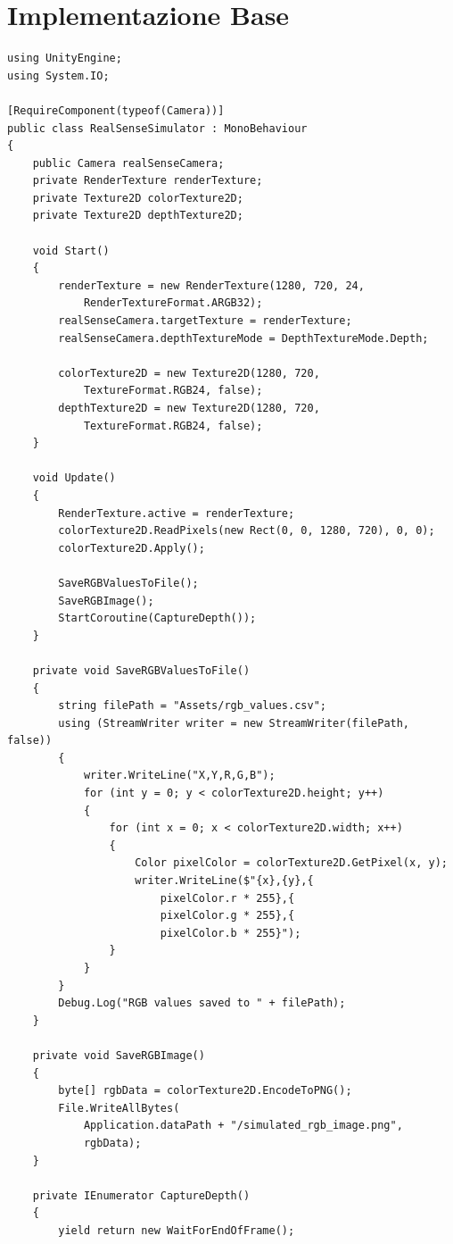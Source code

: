 \documentclass[11pt]{report}
\begin{document}
\section{Implementazione Base}
\begin{lstlisting}[caption=Script base di acquisizione immagini, label=lst:base, lineskip=0.3em]
using UnityEngine;
using System.IO;

[RequireComponent(typeof(Camera))]
public class RealSenseSimulator : MonoBehaviour
{
    public Camera realSenseCamera;
    private RenderTexture renderTexture;
    private Texture2D colorTexture2D;
    private Texture2D depthTexture2D;

    void Start()
    {
        renderTexture = new RenderTexture(1280, 720, 24, 
            RenderTextureFormat.ARGB32);
        realSenseCamera.targetTexture = renderTexture;
        realSenseCamera.depthTextureMode = DepthTextureMode.Depth;
        
        colorTexture2D = new Texture2D(1280, 720, 
            TextureFormat.RGB24, false);
        depthTexture2D = new Texture2D(1280, 720, 
            TextureFormat.RGB24, false);
    }

    void Update()
    {
        RenderTexture.active = renderTexture;
        colorTexture2D.ReadPixels(new Rect(0, 0, 1280, 720), 0, 0);
        colorTexture2D.Apply();
        
        SaveRGBValuesToFile();
        SaveRGBImage();
        StartCoroutine(CaptureDepth());
    }

    private void SaveRGBValuesToFile()
    {
        string filePath = "Assets/rgb_values.csv";
        using (StreamWriter writer = new StreamWriter(filePath, false))
        {
            writer.WriteLine("X,Y,R,G,B");
            for (int y = 0; y < colorTexture2D.height; y++)
            {
                for (int x = 0; x < colorTexture2D.width; x++)
                {
                    Color pixelColor = colorTexture2D.GetPixel(x, y);
                    writer.WriteLine($"{x},{y},{
                        pixelColor.r * 255},{
                        pixelColor.g * 255},{
                        pixelColor.b * 255}");
                }
            }
        }
        Debug.Log("RGB values saved to " + filePath);
    }

    private void SaveRGBImage()
    {
        byte[] rgbData = colorTexture2D.EncodeToPNG();
        File.WriteAllBytes(
            Application.dataPath + "/simulated_rgb_image.png", 
            rgbData);
    }

    private IEnumerator CaptureDepth()
    {
        yield return new WaitForEndOfFrame();
        

\end{lstlisting}
\end{document}
